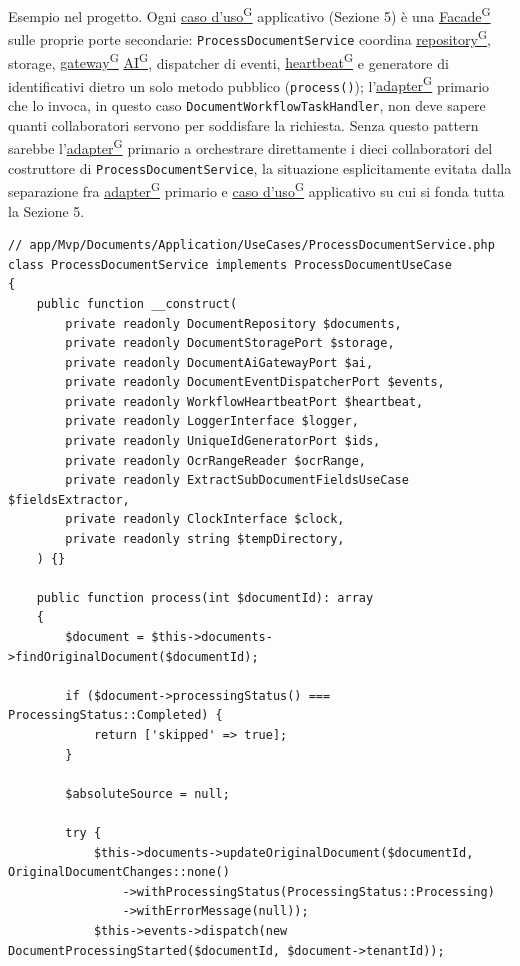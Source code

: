 \documentclass[a4paper,12pt]{article}
\providecommand{\glslink}[2]{\href{https://alittlebyte-19.github.io/Documentazione/glossario.html\#gls-#1}{\underline{#2}\textsuperscript{\scriptsize G}}}
\begin{document}
\begin{sloppypar}
Esempio nel progetto. Ogni \glslink{caso-d-uso-uc}{caso d'uso} applicativo (Sezione 5) è una \glslink{facade}{Facade} sulle proprie porte secondarie: \texttt{ProcessDocumentService} coordina \glslink{repository}{repository}, storage, \glslink{gateway}{gateway} \glslink{intelligenza-artificiale-ai}{AI}, dispatcher di eventi, \glslink{heartbeat}{heartbeat} e generatore di identificativi dietro un solo metodo pubblico (\texttt{process()}); l'\glslink{adapter}{adapter} primario che lo invoca, in questo caso \texttt{DocumentWorkflowTaskHandler}, non deve sapere quanti collaboratori servono per soddisfare la richiesta. Senza questo pattern sarebbe l'\glslink{adapter}{adapter} primario a orchestrare direttamente i dieci collaboratori del costruttore di \texttt{ProcessDocumentService}, la situazione esplicitamente evitata dalla separazione fra \glslink{adapter}{adapter} primario e \glslink{caso-d-uso-uc}{caso d'uso} applicativo su cui si fonda tutta la Sezione 5.

\begin{lstlisting}[style=phplisting, caption={ProcessDocumentService: Facade su repository, storage, gateway AI, eventi ed heartbeat dietro process()}]
// app/Mvp/Documents/Application/UseCases/ProcessDocumentService.php
class ProcessDocumentService implements ProcessDocumentUseCase
{
    public function __construct(
        private readonly DocumentRepository $documents,
        private readonly DocumentStoragePort $storage,
        private readonly DocumentAiGatewayPort $ai,
        private readonly DocumentEventDispatcherPort $events,
        private readonly WorkflowHeartbeatPort $heartbeat,
        private readonly LoggerInterface $logger,
        private readonly UniqueIdGeneratorPort $ids,
        private readonly OcrRangeReader $ocrRange,
        private readonly ExtractSubDocumentFieldsUseCase $fieldsExtractor,
        private readonly ClockInterface $clock,
        private readonly string $tempDirectory,
    ) {}

    public function process(int $documentId): array
    {
        $document = $this->documents->findOriginalDocument($documentId);

        if ($document->processingStatus() === ProcessingStatus::Completed) {
            return ['skipped' => true];
        }

        $absoluteSource = null;

        try {
            $this->documents->updateOriginalDocument($documentId, OriginalDocumentChanges::none()
                ->withProcessingStatus(ProcessingStatus::Processing)
                ->withErrorMessage(null));
            $this->events->dispatch(new DocumentProcessingStarted($documentId, $document->tenantId));


\end{lstlisting}
\end{sloppypar}
\end{document}
